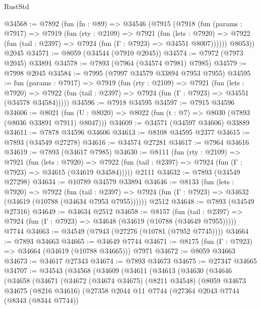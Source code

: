 \begin{lexlean}{RustStd}
\begin{coremodule}
@34568 := @7892
    (fun (fn : @89) =>
    @34546
      (@7915
        (@7918
          (fun (params : @7917) =>
          @7919
            (fun (rty : @2109) =>
            @7921
              (fun (lets : @7920) =>
              @7922 (fun (tail : @2397) => @7924 (fun (Γ : @7923) => @34551 @8007))))))
        @8053))
    @2045
@34571 := @8059 (@34544 (@7910 @2045))
@34574 := @7972 (@7973 @2045) @33891
@34578 := @7893 (@7964 (@34574 @7981) @7985)
@34579 := @7998 @2045
@34584 := @7995 (@7997 @34579 @33894 @7953 @7955)
@34595 := fun (params : @7917) =>
  @7919
    (fun (rty : @2109) =>
    @7921
      (fun (lets : @7920) =>
      @7922 (fun (tail : @2397) => @7924 (fun (Γ : @7923) => @34551 (@34578 @34584)))))
@34596 := @7918 @34595
@34597 := @7915 @34596
@34606 := @8021
    (fun (U : @8020) => @8022 (fun (t : @7) => @8030 (@7893 (@8036 @33891 @7911) @8047)))
@34609 := @34571 (@34597 @34606) @33889
@34611 := @7878 @34596 @34606
@34613 := @8108 @34595 @2377
@34615 := @7893 (@34549 @27278)
@34616 := @34574 @27281
@34617 := @7964 @34616
@34619 := @7893 (@34617 @7985)
@34630 := @8111
    (fun (rty : @2109) =>
    @7921
      (fun (lets : @7920) =>
      @7922 (fun (tail : @2397) => @7924 (fun (Γ : @7923) => @34615 (@34619 @34584)))))
    @2111
@34632 := @7893 (@34549 @27298)
@34634 := @10789 @34579 @33894
@34646 := @8133
    (fun (lets : @7920) =>
    @7922
      (fun (tail : @2397) =>
      @7924 (fun (Γ : @7923) => @34632 (@34619 (@10788 (@34634 @7953 @7955))))))
    @2512
@34648 := @7893 (@34549 @27316)
@34649 := @34634 @2512
@34658 := @8157
    (fun (tail : @2397) => @7924 (fun (Γ : @7923) => @34648 (@34619 (@10788 (@34649 @7955)))))
    @7744
@34663 := @34549 (@7943 (@27276 (@10781 (@7952 @7745))))
@34664 := @7893 @34663
@34665 := @34649 @7744
@34671 := @8175 (fun (Γ : @7923) => @34664 (@34619 (@10788 @34665))) @7971
@34672 := @8059 @34663
@34673 := @34617 @27343
@34674 := @7893 @34673
@34675 := @27347 @34665
@34707 := @34543
    (@34568
      (@34609
        (@34611
          (@34613
            (@34630
              (@34646
                (@34658
                  (@34671
                    (@34672
                      (@34674 @34675)
                      (@8211 @34548)
                      (@8059
                        @34673
                        @34675
                        (@8216 @34616)
                        (@27358
                          @2044
                          @11
                          @7744
                          (@27364
                            @2043
                            @7744
                            (@8343 (@8344 @7744))

\end{coremodule}
\end{lexlean}
